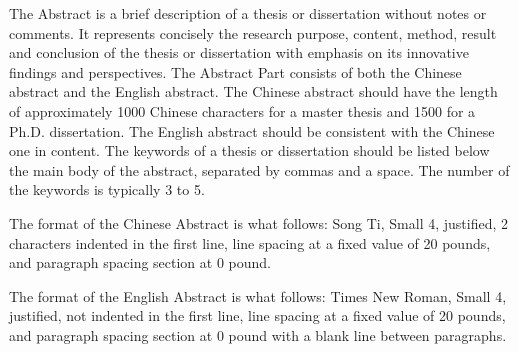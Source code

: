 \begin{englishabstract}
The Abstract is a brief description of a thesis or dissertation without notes or comments. It represents concisely the research purpose, content, method, result and conclusion of the thesis or dissertation with emphasis on its innovative findings and perspectives. The Abstract Part consists of both the Chinese abstract and the English abstract. The Chinese abstract should have the length of approximately 1000 Chinese characters for a master thesis and 1500 for a Ph.D. dissertation. The English abstract should be consistent with the Chinese one in content. The keywords of a thesis or dissertation should be listed below the main body of the abstract, separated by commas and a space. The number of the keywords is typically 3 to 5.

The format of the Chinese Abstract is what follows: Song Ti, Small 4, justified, 2 characters indented in the first line, line spacing at a fixed value of 20 pounds, and paragraph spacing section at 0 pound.

The format of the English Abstract is what follows: Times New Roman, Small 4, justified, not indented in the first line, line spacing at a fixed value of 20 pounds, and paragraph spacing section at 0 pound with a blank line between paragraphs.

 \\

\end{englishabstract}


\XDUpremainmatter

\begin{symbollist}
	\item  {} 
	\item  \makebox [18em][l] {$\in$             } 
	\item  {} 
	\item  {} 
	\item  {} 
	\item  {} 
	\item  {} 
	\item  {} 
	\item  \makebox [18em][l] {$\eta$            } 
	\item  {} 
	\item  \makebox [18em][l] {$\gamma$          } 
	\item  \makebox [18em][l] {$\gamma$          } 
\end{symbollist}

